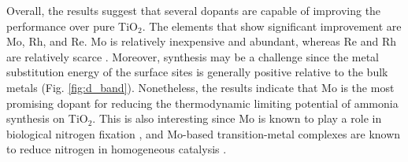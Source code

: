 Overall, the results suggest that several dopants are capable of improving the performance over pure TiO$_2$. The elements that show significant improvement are Mo, Rh, and Re. 
Mo is relatively inexpensive and abundant, whereas Re and Rh are relatively scarce \cite{Vesborg_2012}. Moreover, synthesis may be a challenge since the metal substitution energy of the surface sites is generally positive relative to the bulk metals (Fig. \ref{fig:d_band}). Nonetheless, the results indicate that Mo is the most promising dopant for reducing the thermodynamic limiting potential of ammonia synthesis on TiO$_2$. This is also interesting since Mo is known to play a role in biological nitrogen fixation \cite{Hernandez_2009}, and Mo-based transition-metal complexes are known to reduce nitrogen in homogeneous catalysis \cite{Roux_2017}.








